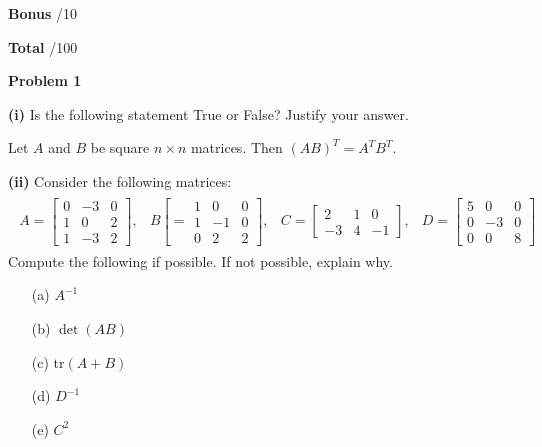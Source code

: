 \documentclass[12pt]{amsbook}
\begin{document}
\vspace{.25cm}

\textbf{Bonus} \;\hspace{.9cm} \underline{\hspace{.75cm}}/10

\vspace{.25cm}

\textbf{Total} \;\hspace{1.1cm} \underline{\hspace{.75cm}}/100










\newpage

\textbf{Problem 1}

\vspace{.25cm}

\textbf{(i)} Is the following statement True or False? Justify your answer.
\begin{center}
Let $A$ and $B$ be square $n\times n$ matrices. Then $(AB)^T = A^TB^T$.
\end{center}

\vspace{4cm}

\textbf{(ii)} Consider the following matrices:
\begin{align*}
\begin{array}{llll}
A=\left[\begin{array}{ccc}
0 & -3 & 0 \\ 1 & 0 & 2 \\ 1 & -3 & 2
\end{array}\right], & B\left[=\begin{array}{ccc}
1 & 0 & 0 \\ 1 & -1 & 0 \\ 0 & 2 & 2
\end{array}\right], & C=\left[\begin{array}{ccc}
2 & 1 & 0 \\ -3 & 4 & -1
\end{array}\right], & D=\left[\begin{array}{ccc}
5 & 0 & 0 \\ 0 & -3 & 0 \\ 0 & 0 & 8
\end{array}\right]
\end{array}
\end{align*}
Compute the following if possible. If not possible, explain why.
\begin{itemize}
\item[(a)] $A^{-1}$
\item[(b)] $\det(AB)$
\item[(c)] $\text{tr}(A+B)$
\item[(d)] $D^{-1}$
\item[(e)] $C^2$
\end{itemize}
\end{document}
